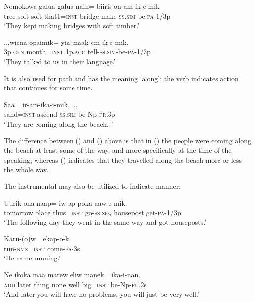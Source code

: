\ea%
\label{ex:x766}
\gll Nomokowa galua-galua nain= biiris on-am-ik-e-mik \\
tree soft-soft that1=\textsc{inst} bridge make-\textsc{ss}.\textsc{sim}-be-\textsc{pa}-1/3p\\
\glt`They kept making bridges with soft timber.'
\z

\ea%
\label{ex:x768}
\gll ...wiena opaimik= yia maak-em-ik-e-mik. \\
3p.\textsc{gen} mouth=\textsc{inst} 1p.\textsc{acc} tell-\textsc{ss}.\textsc{sim}-be-\textsc{pa}-1/3p\\
\glt`They talked to us in their language.'
\z

It is also used for path and has the meaning `along'; the verb indicates action that continues for some time.

\ea%
\label{ex:x767}
\gll Saa= ir-am-ika-i-mik, ... \\
sand=\textsc{inst} ascend-\textsc{ss}.\textsc{sim}-be-Np-\textsc{pr}.3p\\
\glt`They are coming along the beach{\dots}'
\z

The difference between () and () above is that in () the people were coming along the beach at least some of the way, and more specifically at the time of the speaking; whereas () indicates that they travelled along the beach more or less the whole way.

The instrumental may also be utilized to indicate manner: 

\ea%
\label{ex:x1881}
\gll Uurik ona naap= iw-ap poka aaw-e-mik. \\
tomorrow place thus=\textsc{inst} go-\textsc{ss}.\textsc{seq} housepost get-\textsc{pa}-1/3p\\
\glt`The following day they went in the same way and got houseposts.'
\z

\ea%
\label{ex:x773}
\gll Karu-(o)w= ekap-o-k. \\
run-\textsc{nmz}=\textsc{inst} come-\textsc{pa}-3s\\
\glt`He came running.'
\z

\ea%
\label{ex:x1814}
\gll Ne ikoka maa marew eliw  manek= ika-i-nan. \\
\textsc{add} later thing none well big=\textsc{inst} be-Np-\textsc{fu}.2s\\
\glt`And later you will have no problems, you will just be very well.'
\z

